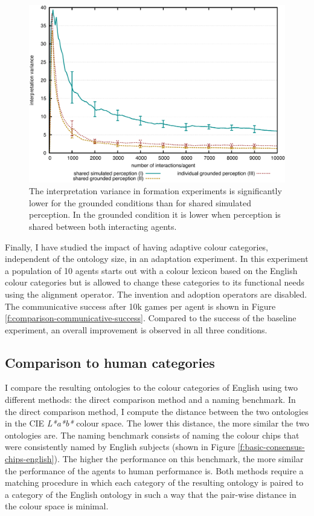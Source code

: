 \begin{figure}[htbp]
\begin{center}
  \includegraphics[width=.8\textwidth]{./experiments/figures/grounding-formation-interpretation-variance.pdf}
  \caption[Interpretation variance in grounded formation experiment in
  three experimental conditions]{The interpretation variance in
    formation experiments is significantly lower for the grounded
    conditions than for shared simulated perception. In the grounded
    condition it is lower when perception is shared between both
    interacting agents.}
\label{f:formation-interpretation-variance}
\end{center}
\end{figure}

Finally, I have studied the impact of having adaptive colour
categories, independent of the ontology size, in an adaptation
experiment. In this experiment a population of 10 agents starts out
with a colour lexicon based on the English colour categories but is
allowed to change these categories to its functional needs using the
alignment operator. The invention and adoption operators are
disabled. The communicative success after 10k games per agent is shown
in Figure \ref{f:comparison-communicative-success}. Compared to the
success of the baseline experiment, an overall improvement is observed
in all three conditions.

\subsection{Comparison to human categories}

I compare the resulting ontologies to the colour categories of English
\citep{sturges95location} using two different methods: the direct
comparison method and a naming benchmark. In the direct
comparison method, I compute the distance between the two ontologies
in the CIE \emph{L*a*b*} colour space. The lower this distance, the
more similar the two ontologies are. The naming benchmark consists of
naming the colour chips that were consistently named by English
subjects \citep{sturges95location} (shown in Figure
\ref{f:basic-consensus-chips-english}). The higher the performance on
this benchmark, the more similar the performance of the agents to
human performance is. Both methods require a matching procedure in
which each category of the resulting ontology is paired to a category
of the English ontology in such a way that the pair-wise distance in
the colour space is minimal.

